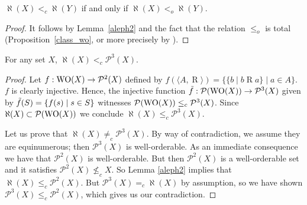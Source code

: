 \begin{corollary}\label{cor:ltc-iff-lto}
  $\aleph(X) <_c \aleph(Y)$ if and only if $\aleph(X) <_o \aleph(Y)$.
\end{corollary}
\begin{proof}
  It follows by Lemma~\ref{aleph2} and the fact that the relation $\leq_o$ is
  total (Proposition~\ref{class_wo}, or more precisely by \cite[Thm.~7.31]{Moscho}).
\end{proof}


\begin{theorem}\label{thm:partes-cubo}
	For any set $X$, $\aleph(X) <_c \mathcal{P}^3(X)$.
\end{theorem}
\begin{proof}	
  Let $f:\mathrm{WO}(X)\rightarrow \mathcal{P}^2(X)$ defined by $f(\langle
  A,\mathrel{R}\rangle) = \{ \{ b\mid b \mathrel{R} a \} \mid a\in A \}$. $f$
  is clearly injective. Hence, the injective function
  $\Tilde{f}: \mathcal{P} (\mathrm{WO}(X)) \rightarrow \mathcal{P}^3(X)$ given
  by $\Tilde{f}(S) = \{ f(s) \mid s\in S \}$ witnesses
  $\mathcal{P} (\mathrm{WO}(X)) \leq_c \mathcal{P}^3(X)$. Since
  $\aleph (X) \subset    \mathcal{P} (\mathrm{WO}(X))$ we conclude
  $\aleph(X) \leq_c \mathcal{P}^3(X)$.
            
	Let us prove that $\aleph(X) \neq_c \mathcal{P}^3(X)$. 
	By way of contradiction, we assume they are equinumerous; then $\mathcal{P}^{3}(X)$ is well-orderable. As an immediate consequence we have that $\mathcal{P}^{2}(X)$ is well-orderable. But then $\mathcal{P}^{2}(X)$ is a well-orderable set and it satisfies 	
	$\mathcal{P}^{2}(X)\nleq_c X$.
	So Lemma \ref{aleph2} implies that 	
	$\aleph(X)\leq_c\mathcal{P}^{2}(X)$.
	But 	
	$\mathcal{P}^{3}(X) =_c \aleph(X)$	
	by assumption, so we have shown $\mathcal{P}^{3}(X) \leq_c \mathcal{P}^{2}(X)$, which gives us our contradiction.
\end{proof}

